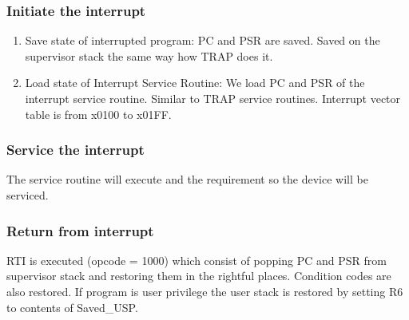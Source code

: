 \subsubsection{Initiate the interrupt}
\begin{enumerate}
    \item Save state of interrupted program: PC and PSR are saved. Saved on the supervisor stack the same way how TRAP does it.
    \item Load state of Interrupt Service Routine: We load PC and PSR of the interrupt service routine. Similar to TRAP service routines. Interrupt vector table is from x0100 to x01FF.
\end{enumerate}

\subsubsection{Service the interrupt}
The service routine will execute and the requirement so the device will be serviced.

\subsubsection{Return from interrupt}
RTI is executed (opcode = 1000) which consist of popping PC and PSR from supervisor stack and restoring them in the rightful places. Condition codes are also restored. If program is user privilege the user stack is restored by setting R6 to contents of Saved\_USP.


















